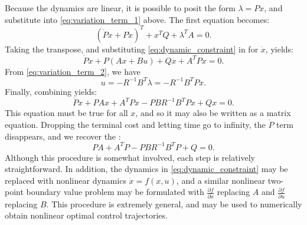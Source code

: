 \documentclass[a4 paper]{article}
\begin{document}
Because the dynamics are linear, it is possible to posit the form \( \lambda = P x \), and substitute into \ref{eq:variation_term_1} above. 
The first equation becomes:
\begin{equation}
    \left( \dot{P} x + P \dot{x} \right)^T + x^T Q + \lambda^T A = 0.
\label{eq:posit_form}
\end{equation}
Taking the transpose, and substituting \ref{eq:dynamic_constraint} in for \( \dot{x} \), yields:
\begin{equation}
    \dot{P} x + P (A x + B u) + Q x + A^T P x = 0.
\label{eq:transpose_substitution}
\end{equation}
From \ref{eq:variation_term_2}, we have
\begin{equation}
    u = -R^{-1} B^T \lambda = -R^{-1} B^T P x.
\label{eq:control_input}
\end{equation}
Finally, combining yields:
\begin{equation}
    \dot{P} x + P A x + A^T P x - P B R^{-1} B^T P x + Q x = 0.
\label{eq:combining_yields}
\end{equation}
This equation must be true for all \( x \), and so it may also be written as a matrix equation.
 Dropping the terminal cost and letting time go to infinity, the \( \dot{P} \) term disappears, and we recover the
:
\begin{equation}
    P A + A^T P - P B R^{-1} B^T P + Q = 0.
\label{eq:riccati_equation}
\end{equation}
Although this procedure is somewhat involved, each step is relatively straightforward. In addition, the dynamics in \ref{eq:dynamic_constraint} 
may be replaced with nonlinear dynamics \( \dot{x} = f(x,u) \), and a similar nonlinear two-point boundary value problem may be formulated 
with \( \frac{\partial f}{\partial x} \) replacing \( A \) and \( \frac{\partial f}{\partial u} \) replacing \( B \). 
This procedure is extremely general, and may be used to numerically obtain nonlinear optimal control trajectories.


\newpage
\end{document}
